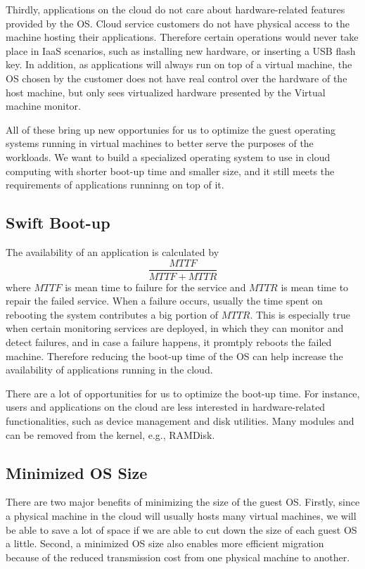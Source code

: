 Thirdly, applications on the cloud do not care about hardware-related features provided by the OS. Cloud service customers do not have physical access to the machine hosting their applications. Therefore certain operations would never take place in IaaS scenarios, such as installing new hardware, or inserting a USB flash key. In addition, as applications will always run on top of a virtual machine, the OS chosen by the customer does not have real control over the hardware of the host machine, but only sees virtualized hardware presented by the Virtual machine monitor.

All of these bring up new opportunies for us to optimize the guest operating systems running in virtual machines to better serve the purposes of the workloads.
We want to build a specialized operating system to use in cloud computing with shorter boot-up time and smaller size, and it still meets the requirements of applications runninng on top of it.

\subsection{Swift Boot-up}
The availability of an application is calculated by
$$\frac{MTTF}{MTTF+MTTR}$$
where $MTTF$ is mean time to failure for the service and $MTTR$ is mean time to repair the failed service. When a failure occurs, usually the time spent on rebooting the system contributes a big portion of $MTTR$. This is especially true when certain monitoring services are deployed, in which they can monitor and detect failures, and in case a failure happens, it promtply reboots the failed machine. Therefore reducing the boot-up time of the OS can help increase the availability of applications running in the cloud.

There are a lot of opportunities for us to optimize the boot-up time. For instance, users and applications on the cloud are less interested in hardware-related functionalities, such as device management and disk utilities. Many modules and can be removed from the kernel, e.g., RAMDisk.

\subsection{Minimized OS Size}
There are two major benefits of minimizing the size of the guest OS. Firstly, since a physical machine in the cloud will usually hosts many virtual machines, we will be able to save a lot of space if we are able to cut down the size of each guest OS a little. Second, a minimized OS size also enables more efficient migration because of the reduced transmission cost from one physical machine to another.

